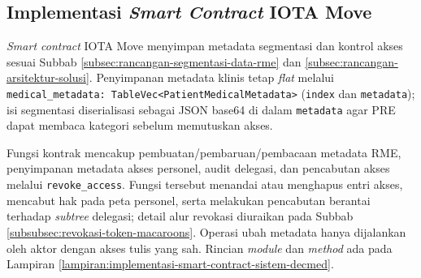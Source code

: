 \subsection{Implementasi \textit{Smart Contract} IOTA Move}
\label{subsec:implementasi-smart-contract-iota-move}


\textit{Smart contract} IOTA Move menyimpan metadata segmentasi dan kontrol akses sesuai Subbab \ref{subsec:rancangan-segmentasi-data-rme} dan \ref{subsec:rancangan-arsitektur-solusi}. Penyimpanan metadata klinis tetap \textit{flat} melalui \texttt{medical\_metadata: TableVec<PatientMedicalMetadata>} (\texttt{index} dan \texttt{metadata}); isi segmentasi diserialisasi sebagai JSON base64 di dalam \texttt{metadata} agar PRE dapat membaca kategori sebelum memutuskan akses.

Fungsi kontrak mencakup pembuatan/pembaruan/pembacaan metadata RME, penyimpanan metadata akses personel, audit delegasi, dan pencabutan akses melalui \texttt{revoke\_access}. Fungsi tersebut menandai atau menghapus entri akses, mencabut hak pada peta personel, serta melakukan pencabutan berantai terhadap \textit{subtree} delegasi; detail alur revokasi diuraikan pada Subbab \ref{subsubsec:revokasi-token-macaroons}. Operasi ubah metadata hanya dijalankan oleh aktor dengan akses tulis yang sah. Rincian \textit{module} dan \textit{method} ada pada Lampiran \ref{lampiran:implementasi-smart-contract-sistem-decmed}.